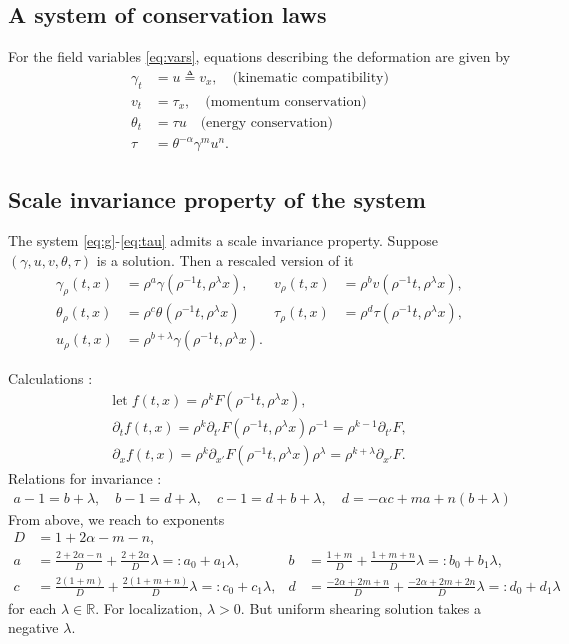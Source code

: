 \documentclass[a4paper,11pt]{article}
\begin{document}
\subsection{A system of conservation laws}
For the field variables \eqref{eq:vars}, equations describing the deformation are given by
\begin{align}
 \gamma_t &= u\triangleq v_x, \quad \text{(kinematic compatibility)} 	\label{eq:g}\\
 v_t &= \tau_x, \quad \text{(momentum conservation)} 	\label{eq:v}\\
 \theta_t &= \tau u \quad \text{(energy conservation)}	\label{eq:th}\\
 \tau &=\theta^{-\alpha}\gamma^m u^n.			\label{eq:tau}
\end{align}





\subsection{Scale invariance property of the system}
The system \eqref{eq:g}-\eqref{eq:tau} admits a scale invariance property. Suppose $(\gamma,u,v,\theta,\tau)$ is a solution. Then a rescaled version of it
\begin{align*}
 \gamma_\rho(t,x) &= \rho^a\gamma(\rho^{-1}t,\rho^\lambda x), &
 v_\rho(t,x) &= \rho^bv(\rho^{-1}t,\rho^\lambda x),\\
 \theta_\rho(t,x) &= \rho^c\theta(\rho^{-1}t,\rho^\lambda x) &
 \tau_\rho(t,x) &= \rho^d\tau(\rho^{-1}t,\rho^\lambda x),\\
 u_\rho(t,x) &= \rho^{b+\lambda}\gamma(\rho^{-1}t,\rho^\lambda x).
\end{align*}

Calculations :
\begin{align*}
 \text{let} \;f(t,x) = \rho^k F(\rho^{-1}t,\rho^\lambda x), \\
 \partial_t f(t,x) = \rho^k \partial_{t'} F(\rho^{-1}t,\rho^\lambda x) \rho^{-1} = \rho^{k-1} \partial_{t'}F, \\
 \partial_x f(t,x) = \rho^k \partial_{x'} F(\rho^{-1}t,\rho^\lambda x) \rho^\lambda = \rho^{k+\lambda} \partial_{x'}F.
\end{align*}
Relations for invariance :
\begin{align*}
 a-1 = b+\lambda, \quad b-1 = d+\lambda, \quad c-1 = d+b+\lambda, \quad d = -\alpha c + m a + n (b+\lambda)
\end{align*}
From above, we reach to exponents
\begin{align*}
 D & = 1+2\alpha-m-n,\\
 a&= \frac{2+2\alpha-n}{D} + \frac{2+2\alpha}{D}\lambda =: a_0 + a_1 \lambda, & b&=\frac{1+m}{D} + \frac{1+m+n}{D}\lambda =: b_0 + b_1\lambda,\\
 c&=\frac{2(1+m)}{D} + \frac{2(1+m+n)}{D}\lambda =: c_0 + c_1\lambda, & d&=\frac{-2\alpha + 2m +n}{D} + \frac{-2\alpha+2m+2n}{D}\lambda =: d_0 + d_1\lambda
\end{align*}
for each $\lambda \in \mathbb{R}$. For localization, $\lambda>0$. But uniform shearing solution takes a negative $\lambda$.
\end{document}
